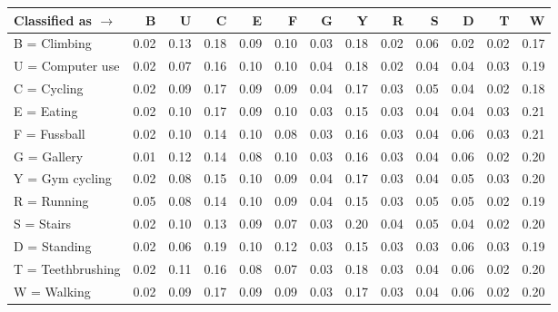 \begin{tabular}{lrrrrrrrrrrrr}
\toprule
Classified as $\rightarrow$ &    B &    U &    C &    E &    F &    G &    Y &    R &    S &    D &    T &    W \\
\midrule
B = Climbing      & 0.02 & 0.13 & 0.18 & 0.09 & 0.10 & 0.03 & 0.18 & 0.02 & 0.06 & 0.02 & 0.02 & 0.17 \\
U = Computer use  & 0.02 & 0.07 & 0.16 & 0.10 & 0.10 & 0.04 & 0.18 & 0.02 & 0.04 & 0.04 & 0.03 & 0.19 \\
C = Cycling       & 0.02 & 0.09 & 0.17 & 0.09 & 0.09 & 0.04 & 0.17 & 0.03 & 0.05 & 0.04 & 0.02 & 0.18 \\
E = Eating        & 0.02 & 0.10 & 0.17 & 0.09 & 0.10 & 0.03 & 0.15 & 0.03 & 0.04 & 0.04 & 0.03 & 0.21 \\
F = Fussball      & 0.02 & 0.10 & 0.14 & 0.10 & 0.08 & 0.03 & 0.16 & 0.03 & 0.04 & 0.06 & 0.03 & 0.21 \\
G = Gallery       & 0.01 & 0.12 & 0.14 & 0.08 & 0.10 & 0.03 & 0.16 & 0.03 & 0.04 & 0.06 & 0.02 & 0.20 \\
Y = Gym cycling   & 0.02 & 0.08 & 0.15 & 0.10 & 0.09 & 0.04 & 0.17 & 0.03 & 0.04 & 0.05 & 0.03 & 0.20 \\
R = Running       & 0.05 & 0.08 & 0.14 & 0.10 & 0.09 & 0.04 & 0.15 & 0.03 & 0.05 & 0.05 & 0.02 & 0.19 \\
S = Stairs        & 0.02 & 0.10 & 0.13 & 0.09 & 0.07 & 0.03 & 0.20 & 0.04 & 0.05 & 0.04 & 0.02 & 0.20 \\
D = Standing      & 0.02 & 0.06 & 0.19 & 0.10 & 0.12 & 0.03 & 0.15 & 0.03 & 0.03 & 0.06 & 0.03 & 0.19 \\
T = Teethbrushing & 0.02 & 0.11 & 0.16 & 0.08 & 0.07 & 0.03 & 0.18 & 0.03 & 0.04 & 0.06 & 0.02 & 0.20 \\
W = Walking       & 0.02 & 0.09 & 0.17 & 0.09 & 0.09 & 0.03 & 0.17 & 0.03 & 0.04 & 0.06 & 0.02 & 0.20 \\
\bottomrule
\end{tabular}
